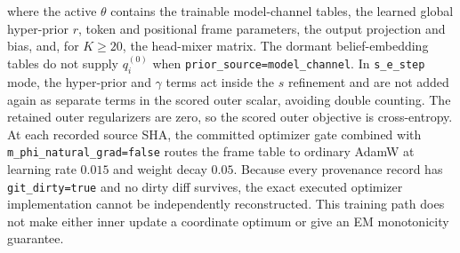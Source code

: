 \documentclass[twoside,11pt]{article}
\begin{document}
where the active $\theta$ contains the trainable model-channel tables, the learned global hyper-prior $r$, token and positional frame parameters, the output projection and bias, and, for $K\geq20$, the head-mixer matrix. The dormant belief-embedding tables do not supply $q_i^{(0)}$ when \texttt{prior\_source=model\_channel}. In \texttt{s\_e\_step} mode, the hyper-prior and $\gamma$ terms act inside the $s$ refinement and are not added again as separate terms in the scored outer scalar, avoiding double counting. The retained outer regularizers are zero, so the scored outer objective is cross-entropy. At each recorded source SHA, the committed optimizer gate combined with \texttt{m\_phi\_natural\_grad=false} routes the frame table to ordinary AdamW at learning rate $0.015$ and weight decay $0.05$. Because every provenance record has \texttt{git\_dirty=true} and no dirty diff survives, the exact executed optimizer implementation cannot be independently reconstructed. This training path does not make either inner update a coordinate optimum or give an EM monotonicity guarantee.
\end{document}
